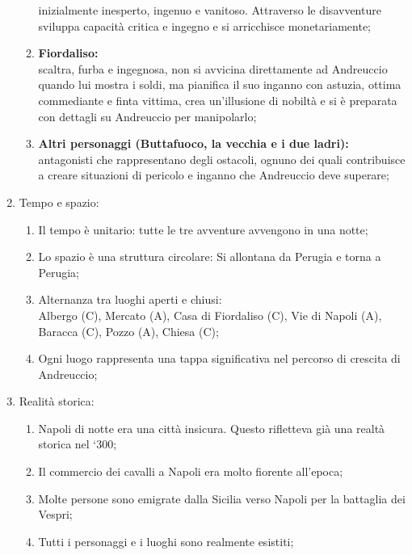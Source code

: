 \documentclass{article}
\begin{document}
\begin{enumerate}
\begin{enumerate}[label*=\arabic*.]
                inizialmente inesperto, ingenuo e vanitoso. Attraverso le disavventure
                sviluppa capacità critica e ingegno e si arricchisce monetariamente;
            \item \textbf{Fiordaliso:}\\
                scaltra, furba e ingegnosa, non si avvicina direttamente ad Andreuccio quando
                lui mostra i soldi, ma pianifica il suo inganno con astuzia, ottima
                commediante e finta vittima, crea un'illusione di nobiltà e si è preparata con
                dettagli su Andreuccio per manipolarlo;
            \item \textbf{Altri personaggi (Buttafuoco, la vecchia e i due ladri):}\\
                antagonisti che rappresentano degli ostacoli, ognuno dei quali contribuisce a
                creare situazioni di pericolo e inganno che Andreuccio deve superare;
        \end{enumerate}
    \item Tempo e spazio:
        \begin{enumerate}[label*=\arabic*.]
            \item Il tempo è unitario: tutte le tre avventure avvengono in una notte;
            \item Lo spazio è una struttura circolare: Si allontana da Perugia e torna a
                Perugia;
            \item Alternanza tra luoghi aperti e chiusi:\\
                Albergo (C), Mercato (A), Casa di Fiordaliso (C), Vie di Napoli (A),
                Baracca (C), Pozzo (A), Chiesa (C);
            \item Ogni luogo rappresenta una tappa significativa nel percorso di crescita
                di Andreuccio;
        \end{enumerate}
    \item Realità storica:
        \begin{enumerate}[label*=\arabic*.]
            \item Napoli di notte era una città insicura. Questo rifletteva già una realtà
                storica nel `300;
            \item Il commercio dei cavalli a Napoli era molto fiorente all'epoca;
            \item Molte persone sono emigrate dalla Sicilia verso Napoli per la battaglia dei
                Vespri; 
            \item Tutti i personaggi e i luoghi sono realmente esistiti;

\end{enumerate}
\end{enumerate}
\end{document}
